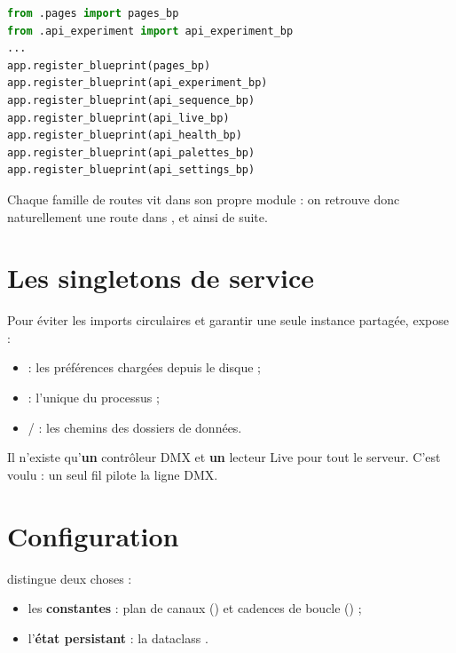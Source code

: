 \begin{lstlisting}[language=Python,caption={Enregistrement des blueprints (\file{webapp/\_\_init\_\_.py}).}]
from .pages import pages_bp
from .api_experiment import api_experiment_bp
...
app.register_blueprint(pages_bp)
app.register_blueprint(api_experiment_bp)
app.register_blueprint(api_sequence_bp)
app.register_blueprint(api_live_bp)
app.register_blueprint(api_health_bp)
app.register_blueprint(api_palettes_bp)
app.register_blueprint(api_settings_bp)
\end{lstlisting}

Chaque famille de routes vit dans son propre module : on retrouve donc
naturellement une route  dans
, et ainsi de suite.

\section{Les singletons de service}

Pour éviter les imports circulaires et garantir une seule instance partagée,
 expose :

\begin{itemize}[leftmargin=1.4em]
  \item {} : les préférences chargées depuis le disque ;
  \item {} : l'unique  du processus ;
  \item {} /  : les chemins des dossiers de
        données.
\end{itemize}

\begin{note}
Il n'existe qu'\textbf{un} contrôleur DMX et \textbf{un} lecteur Live pour tout
le serveur. C'est voulu : un seul fil pilote la ligne DMX.
\end{note}

\section{Configuration}

 distingue deux choses :

\begin{itemize}[leftmargin=1.4em]
  \item les \textbf{constantes} : plan de canaux () et cadences
        de boucle () ;
  \item l'\textbf{état persistant} : la dataclass .
\end{itemize}

